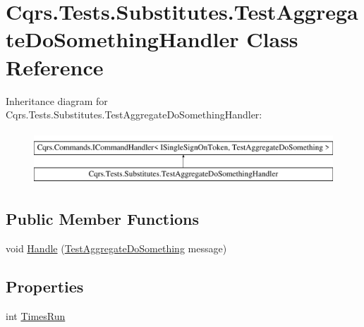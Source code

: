 \hypertarget{classCqrs_1_1Tests_1_1Substitutes_1_1TestAggregateDoSomethingHandler}{}\section{Cqrs.\+Tests.\+Substitutes.\+Test\+Aggregate\+Do\+Something\+Handler Class Reference}
\label{classCqrs_1_1Tests_1_1Substitutes_1_1TestAggregateDoSomethingHandler}
Inheritance diagram for Cqrs.\+Tests.\+Substitutes.\+Test\+Aggregate\+Do\+Something\+Handler\+:\begin{figure}[H]
\begin{center}
\leavevmode
\includegraphics[height=2.000000cm]{classCqrs_1_1Tests_1_1Substitutes_1_1TestAggregateDoSomethingHandler}
\end{center}
\end{figure}
\subsection*{Public Member Functions}
\begin{DoxyCompactItemize}
\item 
void \hyperlink{classCqrs_1_1Tests_1_1Substitutes_1_1TestAggregateDoSomethingHandler_a10331945a4d53abbf14b325f6c8f31f0_a10331945a4d53abbf14b325f6c8f31f0}{Handle} (\hyperlink{classCqrs_1_1Tests_1_1Substitutes_1_1TestAggregateDoSomething}{Test\+Aggregate\+Do\+Something} message)
\end{DoxyCompactItemize}
\subsection*{Properties}
\begin{DoxyCompactItemize}
\item 
int \hyperlink{classCqrs_1_1Tests_1_1Substitutes_1_1TestAggregateDoSomethingHandler_a9f6430dedc93f389679be8abb9b93ab5_a9f6430dedc93f389679be8abb9b93ab5}{Times\+Run}
\end{DoxyCompactItemize}


